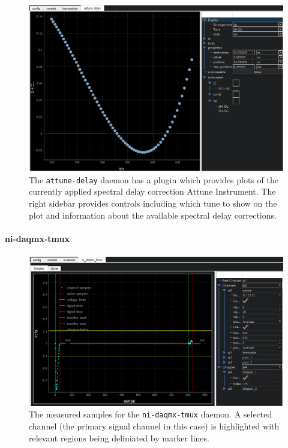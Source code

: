 \begin{landscape}
\begin{figure}
\includegraphics[width=8in]{"yaq/images/attune_delay"}
\caption[\yaqcqtpy{} Attune Delay Plugin]{
	The \texttt{attune-delay} daemon has a plugin which provides plots of the currently applied spectral delay correction Attune Instrument.
	The right sidebar provides controls including which tune to show on the plot and information about the available spectral delay corrections.
}
\label{yaq:fig:attune_delay_plugin}
\end{figure}
\end{landscape}


\paragraph{ni-daqmx-tmux}

\begin{landscape}
\begin{figure}
\includegraphics[width=8in]{"yaq/images/ni_daq_samples"}
\caption[\yaqcqtpy{} NI DAQmx Tmux Plugin (samples)]{
	The measured samples for the \texttt{ni-daqmx-tmux} daemon.
	A selected channel (the primary signal channel in this case) is highlighted with relevant regions being deliniated by marker lines.
}
\label{yaq:fig:ni_daq_samples}
\end{figure}
\end{landscape}

